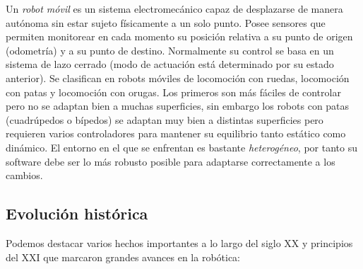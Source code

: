Un \textit{robot móvil} es un sistema electromecánico capaz de desplazarse de ma­nera autónoma sin estar sujeto físicamente a un solo punto\cite{robots-moviles-evolucion-estado-arte}. Posee sensores que permiten monitorear en cada momento su posición relativa a su punto de origen (odometría) y a su punto de destino. Normalmente su control se basa en un sistema de lazo cerrado (modo de actuación está determinado por su estado anterior). Se clasifican en robots móviles de locomoción con ruedas, locomoción con patas y locomoción con orugas.  Los primeros son más fáciles de controlar pero no se adaptan bien a muchas superficies, sin embargo los robots con patas (cuadrúpedos o bípedos) se adaptan muy bien a distintas superficies pero requieren varios controladores para mantener su equilibrio tanto estático como dinámico. El entorno en el que se enfrentan es bastante \textit{heterogéneo}, por tanto su software debe ser lo más robusto posible para adaptarse correctamente a los cambios.\\




\subsection{Evolución histórica}
\label{subsec:evolucion_historica}

Podemos destacar varios hechos importantes a lo largo del siglo XX y principios del XXI que 
marcaron grandes avances en la robótica:

